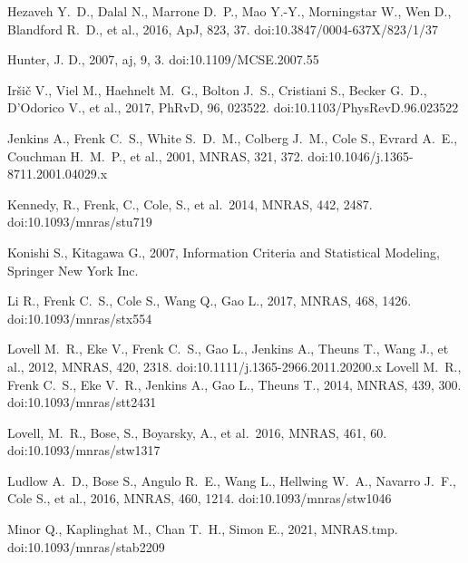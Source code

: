 \documentclass[a4paper, fleqn, usenatbib, useAMS]{mnras}
\def\mnras{MNRAS}
\begin{document}
\begin{thebibliography}{99}
 Hezaveh Y.~D., Dalal N., Marrone D.~P., Mao Y.-Y., Morningstar W., Wen D., Blandford R.~D., et al., 2016, ApJ, 823, 37. doi:10.3847/0004-637X/823/1/37

 Hunter, J. D., 2007, aj, 9, 3. doi:10.1109/MCSE.2007.55

 Ir{\v{s}}i{\v{c}} V., Viel M., Haehnelt M.~G., Bolton J.~S., Cristiani S., Becker G.~D., D'Odorico V., et al., 2017, PhRvD, 96, 023522. doi:10.1103/PhysRevD.96.023522


 Jenkins A., Frenk C.~S., White S.~D.~M., Colberg J.~M., Cole S., Evrard A.~E., Couchman H.~M.~P., et al., 2001, MNRAS, 321, 372. doi:10.1046/j.1365-8711.2001.04029.x

 Kennedy, R.,
  Frenk, C., Cole, S., et al.\ 2014, \mnras, 442,
  2487. doi:10.1093/mnras/stu719

 Konishi S., Kitagawa G., 2007, Information Criteria and Statistical Modeling, Springer New York Inc.

 Li R., Frenk C.~S., Cole S., Wang Q., Gao L., 2017, MNRAS, 468, 1426. doi:10.1093/mnras/stx554


 Lovell M.~R., Eke V., Frenk C.~S., Gao L., Jenkins A., Theuns T., Wang J., et al., 2012, MNRAS, 420, 2318. doi:10.1111/j.1365-2966.2011.20200.x
 Lovell M.~R., Frenk C.~S., Eke V.~R., Jenkins A., Gao L., Theuns T., 2014, MNRAS, 439, 300. doi:10.1093/mnras/stt2431

 Lovell, M.~R., Bose, S., Boyarsky, A., et al.\ 2016, \mnras, 461, 60. doi:10.1093/mnras/stw1317

 Ludlow A.~D., Bose S., Angulo R.~E., Wang L., Hellwing W.~A., Navarro J.~F., Cole S., et al., 2016, MNRAS, 460, 1214. doi:10.1093/mnras/stw1046

 Minor Q., Kaplinghat M., Chan T.~H., Simon E., 2021, MNRAS.tmp. doi:10.1093/mnras/stab2209



\end{thebibliography}
\end{document}
